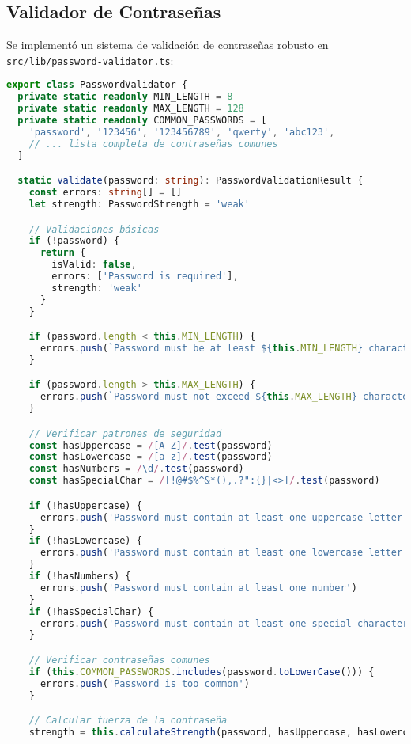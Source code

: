 \documentclass[12pt,a4paper]{article}
\begin{document}
\subsection{Validador de Contraseñas}

Se implementó un sistema de validación de contraseñas robusto en \texttt{src/lib/password-validator.ts}:

\begin{lstlisting}[language=TypeScript, caption=Validador de Contraseñas]
export class PasswordValidator {
  private static readonly MIN_LENGTH = 8
  private static readonly MAX_LENGTH = 128
  private static readonly COMMON_PASSWORDS = [
    'password', '123456', '123456789', 'qwerty', 'abc123',
    // ... lista completa de contraseñas comunes
  ]

  static validate(password: string): PasswordValidationResult {
    const errors: string[] = []
    let strength: PasswordStrength = 'weak'

    // Validaciones básicas
    if (!password) {
      return {
        isValid: false,
        errors: ['Password is required'],
        strength: 'weak'
      }
    }

    if (password.length < this.MIN_LENGTH) {
      errors.push(`Password must be at least ${this.MIN_LENGTH} characters long`)
    }

    if (password.length > this.MAX_LENGTH) {
      errors.push(`Password must not exceed ${this.MAX_LENGTH} characters`)
    }

    // Verificar patrones de seguridad
    const hasUppercase = /[A-Z]/.test(password)
    const hasLowercase = /[a-z]/.test(password)
    const hasNumbers = /\d/.test(password)
    const hasSpecialChar = /[!@#$%^&*(),.?":{}|<>]/.test(password)

    if (!hasUppercase) {
      errors.push('Password must contain at least one uppercase letter')
    }
    if (!hasLowercase) {
      errors.push('Password must contain at least one lowercase letter')
    }
    if (!hasNumbers) {
      errors.push('Password must contain at least one number')
    }
    if (!hasSpecialChar) {
      errors.push('Password must contain at least one special character')
    }

    // Verificar contraseñas comunes
    if (this.COMMON_PASSWORDS.includes(password.toLowerCase())) {
      errors.push('Password is too common')
    }

    // Calcular fuerza de la contraseña
    strength = this.calculateStrength(password, hasUppercase, hasLowercase, hasNumbers, hasSpecialChar)


\end{lstlisting}
\end{document}
